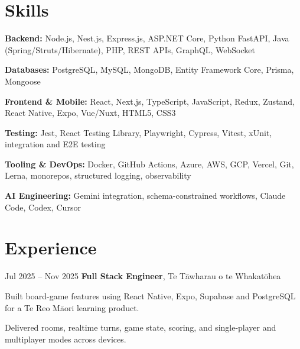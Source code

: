 \documentclass[10pt, letterpaper]{article}
\begin{document}
    \section{Skills}
        \begin{onecolentry}
            \textbf{Backend:} Node.js, Nest.js, Express.js, ASP.NET Core, Python FastAPI, Java (Spring/Struts/Hibernate), PHP, REST APIs, GraphQL, WebSocket
        \end{onecolentry}
        \vspace{0.15 cm}
        \begin{onecolentry}
            \textbf{Databases:} PostgreSQL, MySQL, MongoDB, Entity Framework Core, Prisma, Mongoose
        \end{onecolentry}
        \vspace{0.15 cm}
        \begin{onecolentry}
            \textbf{Frontend \& Mobile:} React, Next.js, TypeScript, JavaScript, Redux, Zustand, React Native, Expo, Vue/Nuxt, HTML5, CSS3
        \end{onecolentry}
        \vspace{0.15 cm}
        \begin{onecolentry}
            \textbf{Testing:} Jest, React Testing Library, Playwright, Cypress, Vitest, xUnit, integration and E2E testing
        \end{onecolentry}
        \vspace{0.15 cm}
        \begin{onecolentry}
            \textbf{Tooling \& DevOps:} Docker, GitHub Actions, Azure, AWS, GCP, Vercel, Git, Lerna, monorepos, structured logging, observability
        \end{onecolentry}
        \vspace{0.15 cm}
        \begin{onecolentry}
            \textbf{AI Engineering:} Gemini integration, schema-constrained workflows, Claude Code, Codex, Cursor
        \end{onecolentry}

    \section{Experience}
        \begin{twocolentry}{Jul 2025 -- Nov 2025}
            \textbf{Full Stack Engineer}, Te Tāwharau o te Whakatōhea
        \end{twocolentry}
        \begin{onecolentry}
            \begin{highlights}
                \item Built board-game features using React Native, Expo, Supabase and PostgreSQL for a Te Reo Māori learning product.
                \item Delivered rooms, realtime turns, game state, scoring, and single-player and multiplayer modes across devices.
            \end{highlights}
        \end{onecolentry}
\end{document}
